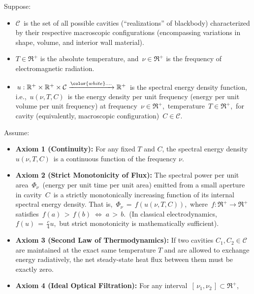 \vskip 0.5cm
\begin{theorem}
\mbox{}
\vskip 0.1cm
\noindent
Suppose:
\begin{itemize}
\item
    $\mathcal{C}$\, is the set of all possible cavities
    (``realizations'' of blackbody)
    characterized by their respective macroscopic configurations
    (encompassing variations in shape, volume, and interior wall material).
\item
    $T \in \Re^{+}$ is the absolute temperature, and
    \,$\nu \in \Re^{+}$ is the frequency of electromagnetic radiation.
\item
    \,$u: \mathbb{R}^+ \times \mathbb{R}^+ \times \mathcal{C} \xrightarrow{{\color{white}....}} \mathbb{R}^+$\,
    is the spectral energy density function,
    i.e., \,$u(\nu, T, C)$\, is the energy density per unit frequency
    (energy per unit volume per unit frequency)
    at frequency \,$\nu \in \Re^{+}$,\, temperature \,$T \in \Re^{+}$,\,
    for cavity (equivalently, macroscopic configuration) \,$C \in \mathcal{C}$.\,
\end{itemize}
Assume:
\begin{itemize}
\item
    \textbf{Axiom 1 (Continuity):}\;
    For any fixed $T$ and $C$, the spectral energy density
    \,$u(\nu, T, C)$\,
    is a continuous function of the frequency $\nu$.
\item
    \textbf{Axiom 2 (Strict Monotonicity of Flux):}\;
    The spectral power per unit area \,$\Phi_\nu$\,
    (energy per unit time per unit area)
    emitted from a small aperture in cavity \,$C$\,
    is a strictly monotonically increasing function
    of its internal spectral energy density.
    That is,
    \,$\Phi_{\nu} \, = \, f(u(\nu, T, C))$,\,
    where
    \,$f: \Re^{+} \to \Re^{+}$\,
    satisfies
    \,$f(a) \, > \, f(b) \;\Longleftrightarrow\; a \, > \, b$.\,
    (In classical electrodynamics,
    \,$f(u) \,=\, \frac{c}{4}u$,\,
    but strict monotonicity is mathematically sufficient).
\item
    \textbf{Axiom 3 (Second Law of Thermodynamics):}\;
    If two cavities $C_{1}, C_{2} \in \mathcal{C}$ are maintained at the exact same temperature $T$ and are allowed to exchange energy radiatively, the net steady-state heat flux between them must be exactly zero.
\item
    \textbf{Axiom 4 (Ideal Optical Filtration):}\;
    For any interval
    \,$[\,\nu_{1}, \nu_{2}\,] \subset \Re^{+}$,\,

\end{itemize}
\end{theorem}

